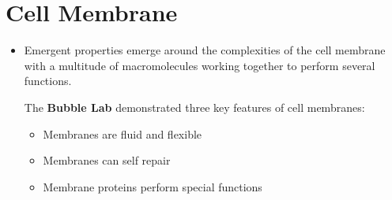 \documentclass[letterpaper]{article}
\begin{document}
\section{Cell Membrane}
\begin{itemize}
\item Emergent properties emerge around the complexities of the cell membrane with a multitude of macromolecules working together to perform several functions.
\begin{lab}
    The \textbf{Bubble Lab} demonstrated three key features of cell membranes:
    \begin{itemize}
        \item Membranes are fluid and flexible
        \item Membranes can self repair
        \item Membrane proteins perform special functions
    \end{itemize}
\end{lab}

\end{itemize}
\end{document}
